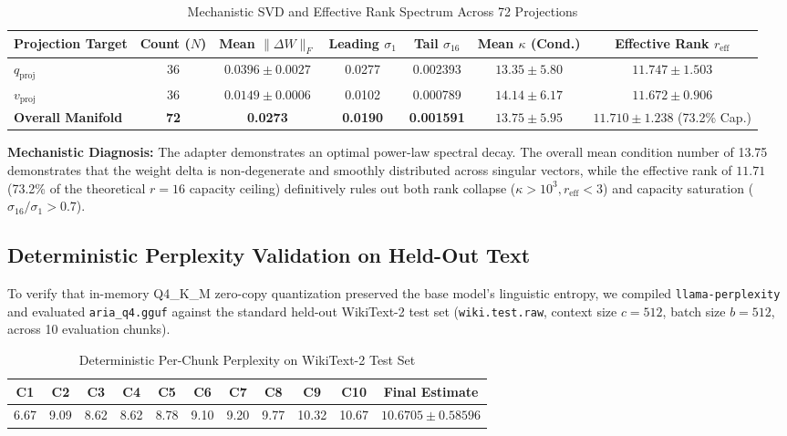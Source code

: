 \documentclass[10pt,a4paper]{article}
\begin{document}
\begin{table}[h!]
\centering
\caption{Mechanistic SVD and Effective Rank Spectrum Across 72 Projections}
\label{tab:svd_metrics}
\footnotesize
\setlength{\tabcolsep}{5pt}
\begin{tabular}{@{}lcccccc@{}}
\toprule
\textbf{Projection Target} & \textbf{Count ($N$)} & \textbf{Mean $\|\Delta W\|_F$} & \textbf{Leading $\sigma_1$} & \textbf{Tail $\sigma_{16}$} & \textbf{Mean $\kappa$ (Cond.)} & \textbf{Effective Rank $r_{\text{eff}}$} \\ \midrule
$q_{\text{proj}}$ & 36 & $0.0396 \pm 0.0027$ & 0.0277 & 0.002393 & $13.35 \pm 5.80$ & $\mathbf{11.747 \pm 1.503}$ \\
$v_{\text{proj}}$ & 36 & $0.0149 \pm 0.0006$ & 0.0102 & 0.000789 & $14.14 \pm 6.17$ & $\mathbf{11.672 \pm 0.906}$ \\ \midrule
\textbf{Overall Manifold} & \textbf{72} & \textbf{0.0273} & \textbf{0.0190} & \textbf{0.001591} & $\mathbf{13.75 \pm 5.95}$ & $\mathbf{11.710 \pm 1.238}$ (73.2\% Cap.) \\ \bottomrule
\end{tabular}
\end{table}

\textbf{Mechanistic Diagnosis:} The adapter demonstrates an optimal power-law spectral decay. The overall mean condition number of 13.75 demonstrates that the weight delta is non-degenerate and smoothly distributed across singular vectors, while the effective rank of $11.71$ (73.2\% of the theoretical $r=16$ capacity ceiling) definitively rules out both rank collapse ($\kappa > 10^3, r_{\text{eff}} < 3$) and capacity saturation ($\sigma_{16} / \sigma_1 > 0.7$).

\subsection{Deterministic Perplexity Validation on Held-Out Text}
To verify that in-memory Q4\_K\_M zero-copy quantization preserved the base model's linguistic entropy, we compiled \texttt{llama-perplexity} and evaluated \texttt{aria\_q4.gguf} against the standard held-out WikiText-2 test set (\texttt{wiki.test.raw}, context size $c=512$, batch size $b=512$, across 10 evaluation chunks).

\begin{table}[h!]
\centering
\caption{Deterministic Per-Chunk Perplexity on WikiText-2 Test Set}
\label{tab:ppl_chunks}
\footnotesize
\setlength{\tabcolsep}{8pt}
\begin{tabular}{@{}cccccccccc|c@{}}
\toprule
\textbf{C1} & \textbf{C2} & \textbf{C3} & \textbf{C4} & \textbf{C5} & \textbf{C6} & \textbf{C7} & \textbf{C8} & \textbf{C9} & \textbf{C10} & \textbf{Final Estimate} \\ \midrule
6.67 & 9.09 & 8.62 & 8.62 & 8.78 & 9.10 & 9.20 & 9.77 & 10.32 & 10.67 & $\mathbf{10.6705 \pm 0.58596}$ \\ \bottomrule
\end{tabular}
\end{table}
\end{document}
